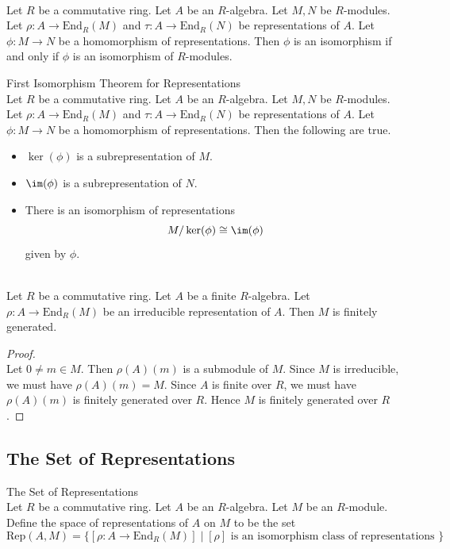 \documentclass[a4paper]{article}
\begin{document}
\begin{lmm}{}{}\\
Let $R$ be a commutative ring. Let $A$ be an $R$-algebra. Let $M,N$ be $R$-modules. Let $\rho:A\to\text{End}_R(M)$ and $\tau:A\to\text{End}_R(N)$ be representations of $A$. Let $\phi:M\to N$ be a homomorphism of representations. Then $\phi$ is an isomorphism if and only if $\phi$ is an isomorphism of $R$-modules. 
\end{lmm}

\begin{thm}{First Isomorphism Theorem for Representations}{}\\
Let $R$ be a commutative ring. Let $A$ be an $R$-algebra. Let $M,N$ be $R$-modules. Let $\rho:A\to\text{End}_R(M)$ and $\tau:A\to\text{End}_R(N)$ be representations of $A$. Let $\phi:M\to N$ be a homomorphism of representations. Then the following are true. 
\begin{itemize}
\item $\ker(\phi)$ is a subrepresentation of $M$. 
\item $\im(\phi)$ is a subrepresentation of $N$. 
\item There is an isomorphism of representations $$M/\ker(\phi)\cong\im(\phi)$$ given by $\phi$. 
\end{itemize}
\end{thm}

\begin{prp}{}{}\\
Let $R$ be a commutative ring. Let $A$ be a finite $R$-algebra. Let $\rho:A\to\text{End}_R(M)$ be an irreducible representation of $A$. Then $M$ is finitely generated. 
\begin{proof}\\
Let $0\neq m\in M$. Then $\rho(A)(m)$ is a submodule of $M$. Since $M$ is irreducible, we must have $\rho(A)(m)=M$. Since $A$ is finite over $R$, we must have $\rho(A)(m)$ is finitely generated over $R$. Hence $M$ is finitely generated over $R$. 
\end{proof}
\end{prp}

\subsection{The Set of Representations}
\begin{defn}{The Set of Representations}{}\\
Let $R$ be a commutative ring. Let $A$ be an $R$-algebra. Let $M$ be an $R$-module. Define the space of representations of $A$ on $M$ to be the set $$\text{Rep}(A,M)=\{[\rho:A\to\text{End}_R(M)]\;|\;[\rho]\text{ is an isomorphism class of representations }\}$$
\end{defn}
\end{document}
